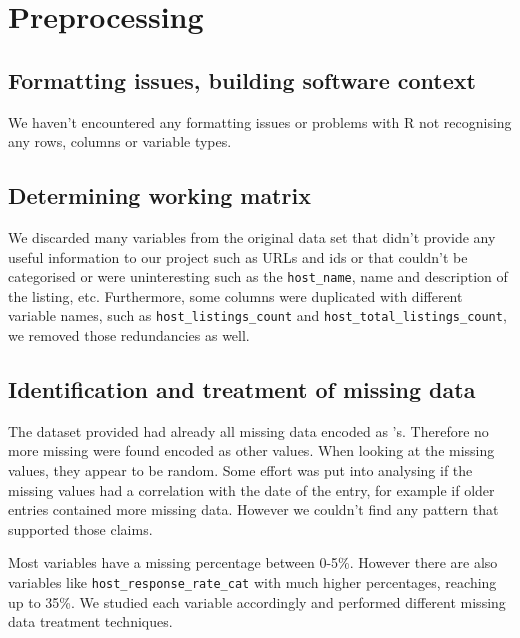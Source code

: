 

\section{Preprocessing}%
\label{sec:preprocessing}


\subsection{Formatting issues, building software context}

We haven't encountered any formatting issues or problems with R not recognising
any rows, columns or variable types.

\subsection{Determining working matrix}%
\label{ssub:work_matrix}

We discarded many variables from the original data set that didn't provide any
useful information to our project such as URLs and ids or that couldn't be
categorised or were uninteresting such as the \texttt{host\_name}, name and
description of the listing, etc. Furthermore, some columns were duplicated with
different variable names, such as \texttt{host\_listings\_count} and
\texttt{host\_total\_listings\_count}, we removed those redundancies as well.

\subsection{Identification and treatment of missing data}

The dataset provided had already all missing data encoded as \NA's. Therefore no
more missing were found encoded as other values. When looking at the missing
values, they appear to be random. Some effort was put into analysing if the missing values had a correlation with the date of the entry, for example if older entries contained more missing data. However we couldn't find any pattern that supported those claims.

Most variables have a missing percentage between 0-5\%. However there are also
variables like \texttt{host\_response\_rate\_cat} with much higher percentages,
reaching up to 35\%. We studied each variable accordingly and performed different missing data treatment techniques.

